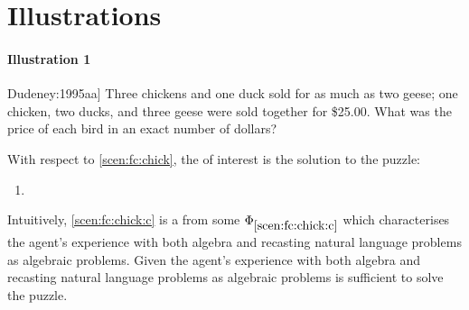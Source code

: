 \section{Illustrations}
\label{cha:fcs:illu}


\paragraph{Illustration 1}

\begin{note}
  \begin{scenario}[\cite[9]{Dudeney:1995aa}]
    \label{scen:fc:chick}%
    Three chickens and one duck sold for as much as two geese; one chicken, two ducks, and three geese were sold together for \$25.00.
    What was the price of each bird in an exact number of dollars?
  \end{scenario}

  \noindent%
  With respect to \autoref{scen:fc:chick}, the \fc{} of interest is the solution to the puzzle:
  \begin{enumerate}[label=C\thescenarioCounter., ref=C\thescenarioCounter]
  \item
    \label{scen:fc:chick:c}
  \end{enumerate}
  Intuitively, \ref{scen:fc:chick:c} is a \fc{} from some \pool{} \(\Phi_{\ref{scen:fc:chick:c}}\) which characterises the agent's experience with both algebra and recasting natural language problems as algebraic problems.
  Given the agent's experience with both algebra and recasting natural language problems as algebraic problems is sufficient to solve the puzzle.


\end{note}
